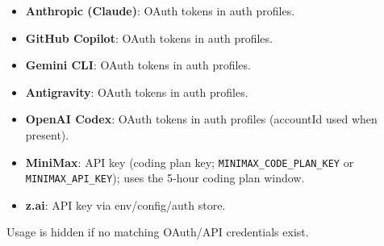 \begin{itemize}
  \item \textbf{Anthropic (Claude)}: OAuth tokens in auth profiles.
  \item \textbf{GitHub Copilot}: OAuth tokens in auth profiles.
  \item \textbf{Gemini CLI}: OAuth tokens in auth profiles.
  \item \textbf{Antigravity}: OAuth tokens in auth profiles.
  \item \textbf{OpenAI Codex}: OAuth tokens in auth profiles (accountId used when present).
  \item \textbf{MiniMax}: API key (coding plan key; \texttt{MINIMAX\_CODE\_PLAN\_KEY} or \texttt{MINIMAX\_API\_KEY}); uses the 5‑hour coding plan window.
  \item \textbf{z.ai}: API key via env/config/auth store.
\end{itemize}


Usage is hidden if no matching OAuth/API credentials exist.


\clearpage
